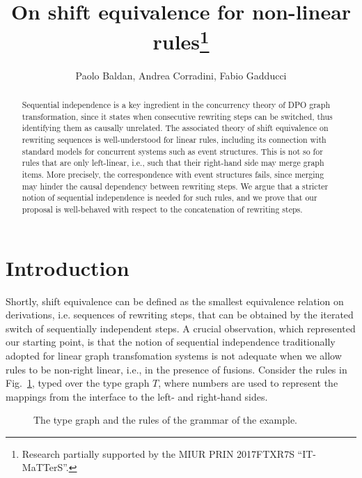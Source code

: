 \documentclass{llncs}
\title{On shift equivalence for non-linear rules\thanks{Research partially supported by the MIUR PRIN 2017FTXR7S ``IT-MaTTerS''.}
}
\author{Paolo Baldan\inst{1}, Andrea Corradini\inst{2}, Fabio Gadducci\inst{2}
}
\institute{Department of Mathematics, University of Padua, Italy \\
		\email{baldan@math.unipd.it}
		\and Department of Computer Science, University of Pisa, Italy \\
		\email{\{andrea.corradini, fabio.gadducci\}@unipi.it}
		}
\begin{document}
\maketitle

\begin{abstract}
Sequential independence is a key ingredient in the concurrency theory of DPO graph transformation, since it states when consecutive rewriting steps can be switched, thus 
identifying them as causally unrelated. The associated theory of shift equivalence on rewriting sequences is well-understood for linear rules, including its 
connection with standard models for concurrent systems such as event structures. 
%
This is not so for rules that are only left-linear, i.e., such that their right-hand side may merge graph items. More precisely, the correspondence with
event structures fails, since merging may hinder the causal dependency between rewriting steps.
%
We argue that a stricter notion of sequential independence is needed for such rules, and we prove that our proposal is well-behaved with respect to the concatenation of
rewriting steps.
\end{abstract}




\section{Introduction}
\label{se:graphs}

Shortly, shift equivalence can be defined as the smallest equivalence relation on derivations, i.e. sequences of rewriting steps,
that can be obtained by the iterated switch of sequentially 
independent steps. A crucial observation, which represented our starting point, is that the notion of sequential independence traditionally
adopted for linear graph transfomation systems is not adequate when we
allow rules to be non-right linear, i.e., in the presence of
fusions. Consider the rules in Fig.~\ref{fi:rules}, typed over the type graph $T$,
where numbers are used to represent the mappings from the interface to the left- and
right-hand sides.

\begin{figure}
  
  
\caption{The type graph  and the rules of the grammar of the example.}
\label{fi:rules}
\end{figure}
\end{document}
